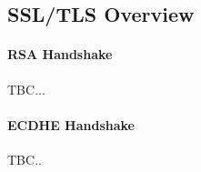\documentclass[../main.tex]{subfiles}
\begin{document}
\subsection{SSL/TLS Overview}
\label{sec:ssloverview}
\paragraph{RSA Handshake}
TBC...

\paragraph{ECDHE Handshake}
TBC..
\end{document}
